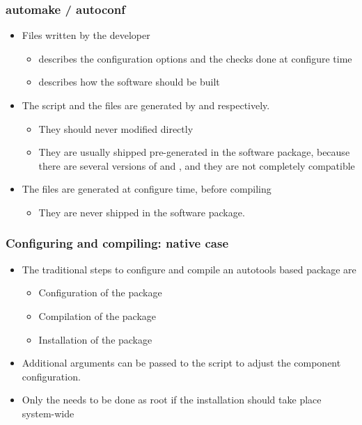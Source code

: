 \begin{frame}
  \frametitle{automake / autoconf}
  \begin{itemize}
  \item Files written by the developer
    \begin{itemize}
    \item {} describes the configuration options and
      the checks done at configure time
    \item {} describes how the software should be
      built
    \end{itemize}
  \item The  script and the  files
    are generated by  and  respectively.
    \begin{itemize}
    \item They should never modified directly
    \item They are usually shipped pre-generated in the software
      package, because there are several versions of 
      and , and they are not completely compatible
    \end{itemize}
  \item The  files are generated at configure time, before
    compiling
    \begin{itemize}
    \item They are never shipped in the software package.
    \end{itemize}
  \end{itemize}
\end{frame}

\begin{frame}
  \frametitle{Configuring and compiling: native case}
  \begin{itemize}
  \item The traditional steps to configure and compile an autotools
    based package are
    \begin{itemize}
    \item Configuration of the package\\
    \item Compilation of the package\\
    \item Installation of the package\\
    \end{itemize}
  \item Additional arguments can be passed to the 
    script to adjust the component configuration.
  \item Only the  needs to be done as root if the
    installation should take place system-wide
  \end{itemize}
\end{frame}

